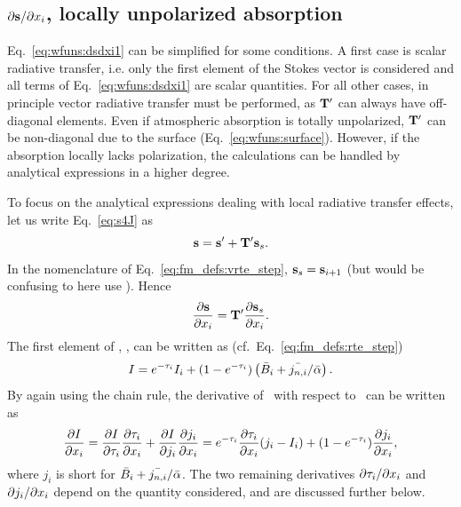 \subsection{$\partial{\bf s}/\partial x_{i}$, locally unpolarized absorption}
\label{sec:wfuns:atmvars:unpol}
%
Eq.~\ref{eq:wfuns:dsdxi1} can be simplified for some conditions. A first case
is scalar radiative transfer, i.e. only the first element of the Stokes vector
is considered and all terms of Eq.~\ref{eq:wfuns:dsdxi1} are scalar quantities.
For all other cases, in principle vector radiative transfer must be performed,
as $\mathbf{T}'$ can always have off-diagonal elements. Even if atmospheric
absorption is totally unpolarized, $\mathbf{T}'$ can be non-diagonal due to the
surface (Eq.~\ref{eq:wfuns:surface}). However, if the absorption locally lacks
polarization, the calculations can be handled by analytical expressions in a
higher degree.

To focus on the analytical expressions dealing with local radiative transfer
effects, let us write Eq.~\ref{eq:s4J} as
\begin{equation}
  {\bf s} = {\bf s}' + \mathbf{T}'{\bf s}_{s}.
\end{equation}
In the nomenclature of Eq.~\ref{eq:fm_defs:vrte_step},
${\bf s}_{s}={\bf s}_{i+1}$ (but would be confusing to here use ).
Hence
\begin{displaymath}
  \frac{\partial{\bf s}}{\partial x_{i}} = \mathbf{T}'
    \frac{\partial{\bf s}_{s}}{\partial x_{i}}.
\end{displaymath}
The first element of , \StoI, can be written as (cf.\
Eq.~\ref{eq:fm_defs:rte_step})
\begin{equation}
  \label{eq:I4J}
  I = e^{-\tau_{i}}I_{i} + (1-e^{-\tau_{i}})\left(\bar{B}_i+{\bar{j_{n,i}}}/{\bar{{\alpha}}}\right).
\end{equation}
By again using the chain rule, the derivative of \StoI\ with respect to
\aSttElm{i}\ can be written as
\begin{equation}
  \frac{\partial I}{\partial x_{i}} =
  \frac{\partial I}{\partial\tau_{i}}\frac{\partial\tau_{i}}{\partial x_{i}} + 
  \frac{\partial I}{\partial j_i}
  \frac{\partial j_i}{\partial x_{i}} = 
   e^{-\tau_{i}}\frac{\partial\tau_{i}}{\partial x_{i}}
      (j_i-I_{i}) +
  (1-e^{-\tau_{i}})\frac{\partial j_i}{\partial x_{i}},
  \label{eq:wfuns:dsdxi2}
\end{equation}
where $j_i$ is short for $\bar{B}_i+{\bar{j_{n,i}}}/{\bar{{\alpha}}}$.
The two remaining derivatives $\partial\tau_{i}/\partial x_{i}$ and
$\partial j_i/\partial x_{i}$
depend on the quantity considered, and are discussed further below.

